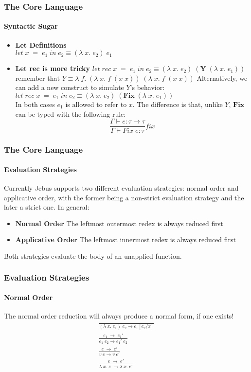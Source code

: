 \documentclass[xcolor=table]{beamer}
\newcommand{\bs}[1]{\boldsymbol{#1}}
\begin{document}
\begin{frame}
\frametitle{The Core Language}
\framesubtitle{Syntactic Sugar}
\begin{itemize}
\item \textbf{Let Definitions} \\
$let \; x \; = \; e_1 \; in \; e_2 \equiv (\lambda \; x. \;e_2 )\; e_1$ \\
\item \textbf{Let rec is more tricky} 
$let\; rec \; x \; = \; e_1 \; in \; e_2 \equiv (\lambda \; x. \;e_2 )\; (\bs{Y} \; (\lambda \; x. \;e_1 ))$ \\
remember that $Y \equiv \lambda \;f. \; (\lambda\; x. \; f \; (x\; x)) \; (\lambda\; x. \; f\;(x\;x))$
Alternatively, we can add a new construct to simulate $Y$'s behavior: 
$let\; rec \; x \; = \; e_1 \; in \; e_2 \equiv (\lambda \; x. \;e_2 )\; (\bs{Fix} \; (\lambda \; x. \;e_1 ))$ \\
In both cases $e_1$ is allowed to refer to $x$. The difference is that, unlike $Y$, $\bs{Fix}$ can be typed with the following rule:
$$ \frac{\Gamma \vdash e:\tau \rightarrow \tau}{\Gamma \vdash Fix \;e:\tau }fix  $$
\end{itemize}
\end{frame}

\begin{frame}
\frametitle{The Core Language}
\framesubtitle{Evaluation Strategies}
\begin{block}{
Currently Jebus supports two different evaluation strategies: normal order and applicative order, with the former being a 
non-strict evaluation strategy and the later a strict one.
}
In general:
\begin{itemize}
\item \textbf{Normal Order} The leftmost outermost redex is always reduced first
\\
\item \textbf{Applicative Order} The leftmost innermost redex is always reduced first
\end{itemize}

Both strategies evaluate the body of an unapplied  function.

\end{block}
\end{frame}

\begin{frame}
\frametitle{Evaluation Strategies}
\framesubtitle{Normal Order}
\begin{block}{The normal order reduction will always produce a normal form, if one exists!}
\begin{gather*}
\frac{}{ (\lambda \;x.\;e_1)\;e_2\rightarrow e_1 [e_2/x]} \\[0.25cm]
\frac{e_1\;\rightarrow \;e_1'}{e_1 \; e_2 \rightarrow e_1' \; e_2} \\[0.25cm]
\frac{e\;\rightarrow\;e'}{v \; e \rightarrow v \; e'} \\[0.25cm]
\frac{e\;\rightarrow\;e'}{\lambda\;x.\;e\; \rightarrow \lambda \;x. \;e'} \\[0.25cm]
\end{gather*}

\end{block}
\end{frame}
\end{document}

